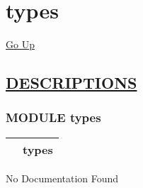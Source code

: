 \chapter*{\color{headfile}
types
}
\hypertarget{ecldoc:toc:types}{}
\hyperlink{ecldoc:toc:root}{Go Up}


\section*{\underline{\textsf{DESCRIPTIONS}}}
\subsection*{\textsf{\colorbox{headtoc}{\color{white} MODULE}
types}}

\hypertarget{ecldoc:types}{}

{\renewcommand{\arraystretch}{1.5}
\begin{tabularx}{\textwidth}{|>{\raggedright\arraybackslash}l|X|}
\hline
\hspace{0pt}\mytexttt{\color{red} } & \textbf{types} \\
\hline
\end{tabularx}
}

\par





No Documentation Found








